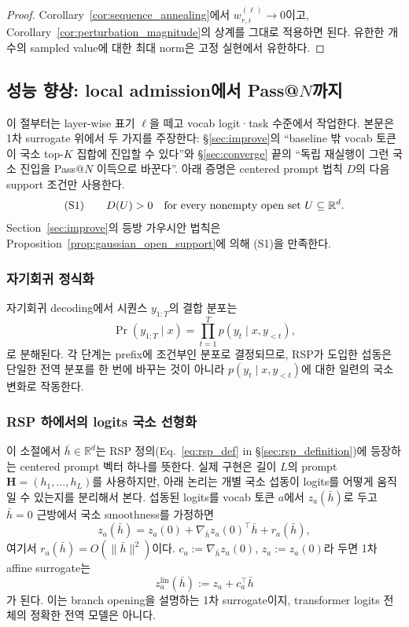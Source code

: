 \begin{proof}
Corollary~\ref{cor:sequence_annealing}에서 $w_{r,i}^{(\ell)}\to 0$이고, Corollary~\ref{cor:perturbation_magnitude}의 상계를 그대로 적용하면 된다. 유한한 개수의 sampled value에 대한 최대 norm은 고정 실현에서 유한하다.
\end{proof}

\subsection{성능 향상: local admission에서 Pass@$N$까지}

이 절부터는 layer-wise 표기 $\ell$을 떼고 vocab logit·task 수준에서 작업한다. 본문은 1차 surrogate 위에서 두 가지를 주장한다: \S\ref{sec:improve}의 ``baseline 밖 vocab 토큰이 국소 top-$K$ 집합에 진입할 수 있다''와 \S\ref{sec:converge} 끝의 ``독립 재실행이 그런 국소 진입을 Pass@$N$ 이득으로 바꾼다''. 아래 증명은 centered prompt 법칙 $D$의 다음 support 조건만 사용한다.
\[
\textnormal{(S1)}\qquad D(U) > 0 \quad \text{for every nonempty open set } U \subseteq \mathbb{R}^d.
\]
Section~\ref{sec:improve}의 등방 가우시안 법칙은 Proposition~\ref{prop:gaussian_open_support}에 의해 (S1)을 만족한다.

\subsubsection{자기회귀 정식화}

자기회귀 decoding에서 시퀀스 $y_{1:T}$의 결합 분포는
\[
\Pr(y_{1:T} \mid x) = \prod_{t=1}^T p(y_t \mid x, y_{<t}),
\]
로 분해된다. 각 단계는 prefix에 조건부인 분포로 결정되므로, RSP가 도입한 섭동은 단일한 전역 분포를 한 번에 바꾸는 것이 아니라 $p(y_t \mid x, y_{<t})$에 대한 일련의 국소 변화로 작동한다.

\subsubsection{RSP 하에서의 logits 국소 선형화}

이 소절에서 $\bar h\in\mathbb{R}^d$는 RSP 정의(Eq.~\eqref{eq:rsp_def} in §\ref{sec:rsp_definition})에 등장하는 centered prompt 벡터 하나를 뜻한다. 실제 구현은 길이 $L$의 prompt $\mathbf{H}=(h_1,\dots,h_L)$를 사용하지만, 아래 논리는 개별 국소 섭동이 logits를 어떻게 움직일 수 있는지를 분리해서 본다. 섭동된 logits를 vocab 토큰 $a$에서 $z_a(\bar h)$로 두고 $\bar h=0$ 근방에서 국소 smoothness를 가정하면
\[
z_a(\bar h) = z_a(0) + \nabla_{\bar h} z_a(0)^\top \bar h + r_a(\bar h),
\]
여기서 $r_a(\bar h) = O(\|\bar h\|^2)$이다. $c_a := \nabla_{\bar h} z_a(0)$, $z_a := z_a(0)$라 두면 1차 affine surrogate는
\[
z_a^{\mathrm{lin}}(\bar h) := z_a + c_a^\top \bar h
\]
가 된다. 이는 branch opening을 설명하는 1차 surrogate이지, transformer logits 전체의 정확한 전역 모델은 아니다.

